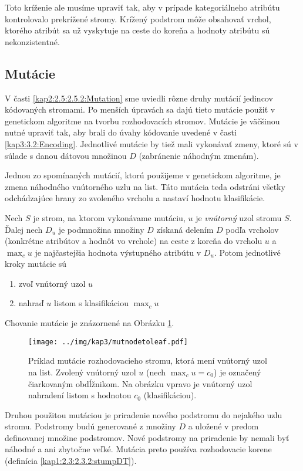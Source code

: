 Toto kríženie ale musíme upraviť tak, aby v prípade kategoriálneho atribútu kontrolovalo prekrížené stromy. Krížený podstrom môže obsahovať vrchol, ktorého atribút sa už vyskytuje na ceste do koreňa a hodnoty atribútu sú nekonzistentné.

\subsection{Mutácie}\label{kap3:3.4:3.4.2:Mutation}
V časti \ref{kap2:2.5:2.5.2:Mutation} sme uviedli rôzne druhy mutácií jedincov kódovaných stromami. Po menších úpravách sa dajú tieto mutácie použiť v genetickom algoritme na tvorbu rozhodovacích stromov. Mutácie je väčšinou nutné upraviť tak, aby brali do úvahy kódovanie uvedené v časti \ref{kap3:3.2:Encoding}. Jednotlivé mutácie by tiež mali vykonávať zmeny, ktoré sú v súlade s danou dátovou množinou $D$ (zabránenie náhodným zmenám).

Jednou zo spomínaných mutácií, ktorú použijeme v genetickom algoritme, je zmena náhodného vnútorného uzlu na list. Táto mutácia teda odstráni všetky odchádzajúce hrany zo zvoleného vrcholu a nastaví hodnotu klasifikácie.

Nech $S$ je strom, na ktorom vykonávame mutáciu, $u$ je \emph{vnútorný} uzol stromu $S$. Ďalej nech $D_u$ je podmnožina množiny $D$ získaná delením $D$ podľa vrcholov (konkrétne atribútov a hodnôt vo vrchole) na ceste z koreňa do vrcholu $u$ a $\max_c u$ je najčastejšia hodnota výstupného atribútu v $D_u$. Potom jednotlivé kroky mutácie sú
\begin{enumerate}
\item zvoľ vnútorný uzol $u$
\item nahraď $u$ listom s klasifikáciou $\max_c u$
\end{enumerate}
Chovanie mutácie je znázornené na Obrázku \ref{fig:mutnodetoleaf}.

\begin{figure}[h]
\centering
\centerline{\mbox{\texttt{[image: ../img/kap3/mutnodetoleaf.pdf]}}}
\caption{Príklad mutácie rozhodovacieho stromu, ktorá mení vnútorný uzol na list. Zvolený vnútorný uzol $u$ (nech $\max_c u = c_0$) je označený čiarkovaným obdĺžnikom. Na obrázku vpravo je vnútorný uzol nahradení listom s hodnotou $c_0$ (klasifikáciou).}\label{fig:mutnodetoleaf}
\end{figure}

Druhou použitou mutáciou je priradenie nového podstromu do nejakého uzlu stromu. Podstromy budú generované z množiny $D$ a uložené v predom definovanej množine podstromov. Nové podstromy na priradenie by nemali byť náhodné a ani zbytočne veľké. Mutácia preto používa rozhodovacie korene (definícia \ref{kap1:2.3:2.3.2:stumpDT}).

